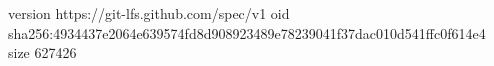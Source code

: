 version https://git-lfs.github.com/spec/v1
oid sha256:4934437e2064e639574fd8d908923489e78239041f37dac010d541ffc0f614e4
size 627426
